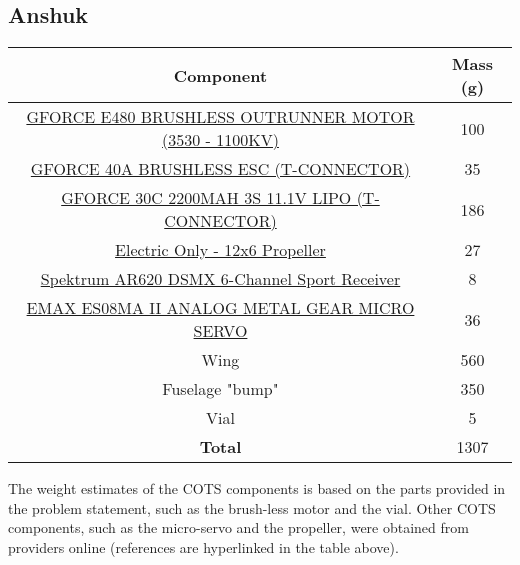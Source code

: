     \subsection{Anshuk}
    \begin{table}[H]
        \begin{tabular}{|c|c| } %
            \hline \textbf{Component} & \textbf{Mass (g)} \\ \hline %
            \href{https://www.amazon.com/Brushless-Outrunner-Multicopters-Helicopter-Control/dp/B08MKQFSVF/ref=asc_df_B08MKQFSVF/?tag=hyprod-20&linkCode=df0&hvadid=475795164185&hvpos=&hvnetw=g&hvrand=9902342740412303481&hvpone=&hvptwo=&hvqmt=&hvdev=c&hvdvcmdl=&hvlocint=&hvlocphy=2840&hvtargid=pla-1195392311214&th=1}{GFORCE E480 BRUSHLESS OUTRUNNER MOTOR (3530 - 1100KV)} & 100 \\ \hline
            \href{http://www.valuehobby.com/gforce-40a-esc.html}{GFORCE 40A BRUSHLESS ESC (T-CONNECTOR)} & 35 \\ \hline
            \href{http://www.valuehobby.com/30c-2200mah-3s-t.html}{GFORCE 30C 2200MAH 3S 11.1V LIPO (T-CONNECTOR)} & 186 \\ \hline
            \href{https://www.masterairscrew.com/products/electric-only-12x6-propeller?currency=USD&utm_medium=cpc&utm_source=google&utm_campaign=Google\%20Shopping&gclid=CjwKCAiA9aKQBhBREiwAyGP5laqPgb8z2BGon5sD8qHYRZQVab7IcA0DZg8DOcFMsDTccBgRqirzgBoC1wkQAvD_BwE}{Electric Only - 12x6 Propeller} & 27 \\ \hline
            \href{https://www.horizonhobby.com/product/ar620-dsmx-6-channel-sport-receiver/SPMAR620.html?gclid=CjwKCAiA9aKQBhBREiwAyGP5lX6-hyQKl87DI0WH0pgWG2HS0woZKcd-L2bMRS_qWmVI1fLqpeCX0BoCrRAQAvD_BwE}{Spektrum AR620 DSMX 6-Channel Sport Receiver} & 8 \\ \hline
            \href{https://arrishobby.com/emax-es08ma-ii-12g-mini-metal-gear-analog-servo-p0842.html?VariantsId=12700}{EMAX ES08MA II ANALOG METAL GEAR MICRO SERVO} & 36 \\ \hline
            Wing & 560 \\ \hline
            Fuselage "bump" & 350 \\ \hline
            Vial & 5 \\ \hline
            \textbf{Total} & 1307 \\ \hline
        \end{tabular}
        \end{table}
        The weight estimates of the COTS components is based on the parts provided in the problem statement, such as the brush-less motor and the vial. Other COTS components, such as the micro-servo and the propeller, were obtained from providers online (references are hyperlinked in the table above). 
        
